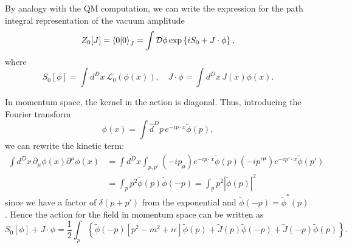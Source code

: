 \documentclass{article}
\numberwithin{equation}{section}
\begin{document}
By analogy with the QM computation, we can write the expression for the path integral representation of the vacuum amplitude
\begin{equation} \label{eq:vacuum_amplitude}
    Z_0[J] = \braket{0}{0}_J = \int \mathcal{D} \phi \exp\left\{i S_0 + J \cdot \phi\right\},
\end{equation}
where
\begin{equation} \label{eq:scalar_action}
    S_0[\phi] = \int d^Dx\, \mathcal{L}_0(\phi(x)), \quad J\cdot \phi = \int d^Dx\, J(x) \phi(x).
\end{equation}

In momentum space, the kernel in the action is diagonal. Thus, introducing the Fourier transform
\begin{equation}
    \phi(x) = \int \hat{d}^Dp\, e^{-ip \cdot x} \tilde{\phi}(p),
\end{equation}
we can rewrite the kinetic term:
\begin{equation}
\begin{aligned}
    \int d^Dx\, \partial_\mu \phi(x) \partial^\mu \phi(x) &= \int d^Dx \int_{p, p'} (-ip_\mu) e^{-ip\cdot x} \tilde{\phi}(p) (-ip'^\mu) e^{-ip'\cdot x} \tilde{\phi}(p') \\
    &= \int_p p^2 \tilde{\phi}(p) \tilde{\phi}(-p) = \int_p p^2 |\tilde{\phi}(p)|^2
\end{aligned}
\end{equation} 
since we have a factor of $\delta(p + p')$ from the exponential and $\tilde{\phi}(-p) = \tilde{\phi}^*(p)$. Hence the action for the field in momentum space can be written as 
\begin{equation}
    S_0[\phi] + J \cdot \phi = \frac{1}{2} \int_p \left\{\tilde{\phi}(-p)\left[p^2-m^2 + i\epsilon\right] \tilde{\phi}(p) + \tilde{J}(p) \tilde{\phi}(-p) + \tilde{J}(-p) \tilde{\phi}(p)\right\}.
\end{equation}
\end{document}
